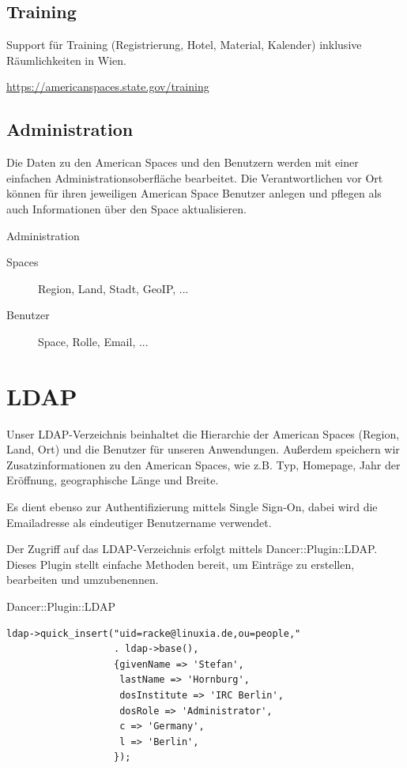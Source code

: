\subsection{Training}

Support für Training (Registrierung, Hotel, Material, Kalender)
inklusive Räumlichkeiten in Wien.

\url{https://americanspaces.state.gov/training}
    
\subsection{Administration}

Die Daten zu den American Spaces und den Benutzern werden
mit einer einfachen Administrationsoberfläche bearbeitet.
Die Verantwortlichen vor Ort können für ihren
jeweiligen American Space Benutzer anlegen und pflegen
als auch Informationen über den Space aktualisieren.

\begin{frame}{Administration}
\begin{description}
\item[Spaces] Region, Land, Stadt, GeoIP, ...
\item[Benutzer] Space, Rolle, Email, ...
\end{description}
\end{frame}

\section{LDAP}

Unser LDAP-Verzeichnis beinhaltet die Hierarchie der American Spaces
(Region, Land, Ort) und die Benutzer für unseren Anwendungen.
Außerdem speichern wir Zusatzinformationen zu den American Spaces,
wie z.B. Typ, Homepage, Jahr der Eröffnung, geographische Länge und Breite.
    
Es dient ebenso zur Authentifizierung mittels Single Sign-On, dabei
wird die Emailadresse als eindeutiger Benutzername verwendet.
    
Der Zugriff auf das LDAP-Verzeichnis erfolgt mittels
Dancer::Plugin::LDAP. Dieses Plugin stellt einfache
Methoden bereit, um Einträge zu erstellen, bearbeiten
und umzubenennen.

\begin{frame}[fragile]{Dancer::Plugin::LDAP}
\begin{lstlisting}
ldap->quick_insert("uid=racke@linuxia.de,ou=people," 
                   . ldap->base(),
                   {givenName => 'Stefan',
                    lastName => 'Hornburg',
                    dosInstitute => 'IRC Berlin',
                    dosRole => 'Administrator',
                    c => 'Germany',
                    l => 'Berlin',
                   });
\end{lstlisting}
\end{frame}

